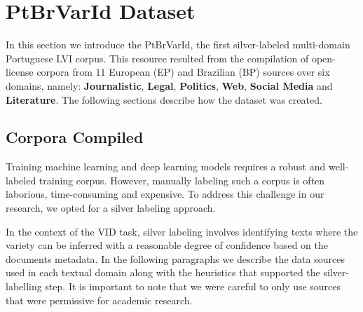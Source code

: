 \section{PtBrVarId Dataset}
\label{sec:create_corpus}

In this section we introduce the PtBrVarId, the first silver-labeled multi-domain Portuguese LVI corpus. This resource resulted from the compilation of open-license corpora from $11$  European (EP) and Brazilian (BP) sources over six domains, namely: \textbf{Journalistic}, \textbf{Legal}, \textbf{Politics}, \textbf{Web}, \textbf{Social Media} and \textbf{Literature}. The following sections describe how the dataset was created. 



\subsection{Corpora Compiled}
\label{subsec:compiling}

Training machine learning and deep learning models requires a robust and well-labeled training corpus. However, manually labeling such a corpus is often laborious, time-consuming and expensive. To address this challenge in our research, we opted for a silver labeling approach. 

In the context of the VID task, silver labeling involves identifying texts where the variety can be inferred with a reasonable degree of confidence based on the  documents metadata. In the following paragraphs we describe the data sources used in each textual domain along with the heuristics that supported the silver-labelling step. It is important to note that we were careful to only use sources that were permissive for academic research.


